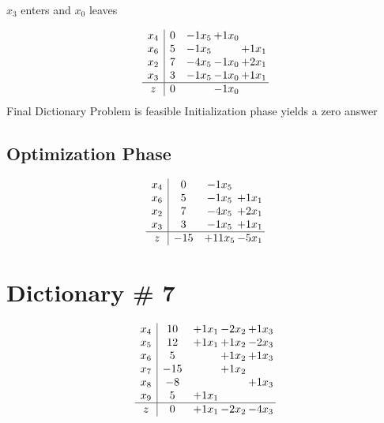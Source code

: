 \documentclass[12pt]{article}
\begin{document}
 $ x_{3} $ enters and $ x_{0} $ leaves 

 \[\begin{array}{c| c c@{\hskip 2pt} c@{\hskip 2pt} c@{\hskip 2pt} }
 x_{4}   &  0 & -1 x_{5} & + 1 x_{0} &   \\
 x_{6}   &  5 & -1 x_{5} &   & + 1 x_{1}\\
 x_{2}   &  7 & -4 x_{5} & -1 x_{0} & + 2 x_{1}\\
 x_{3}   &  3 & -1 x_{5} & -1 x_{0} & + 1 x_{1}\\
\hline
z    &  0  &   & -1 x_{0} &   \\
\end{array}\]
Final Dictionary
Problem is feasible Initialization phase yields a zero answer 

\subsection{Optimization Phase}
\[\begin{array}{c| c c@{\hskip 2pt} c@{\hskip 2pt} }
 x_{4}   &  0 & -1 x_{5} &   \\
 x_{6}   &  5 & -1 x_{5} & + 1 x_{1}\\
 x_{2}   &  7 & -4 x_{5} & + 2 x_{1}\\
 x_{3}   &  3 & -1 x_{5} & + 1 x_{1}\\
\hline
z    &  -15 & + 11 x_{5} & -5 x_{1}\\
\end{array}\]

\section{Dictionary \# 7}

\[\begin{array}{c| c c@{\hskip 2pt} c@{\hskip 2pt} c@{\hskip 2pt} }
 x_{4}   &  10 & + 1 x_{1} & -2 x_{2} & + 1 x_{3}\\
 x_{5}   &  12 & + 1 x_{1} & + 1 x_{2} & -2 x_{3}\\
 x_{6}   &  5  &   & + 1 x_{2} & + 1 x_{3}\\
 x_{7}   &  -15  &   & + 1 x_{2} &   \\
 x_{8}   &  -8  &    &   & + 1 x_{3}\\
 x_{9}   &  5 & + 1 x_{1} &    &   \\
\hline
z    &  0 & + 1 x_{1} & -2 x_{2} & -4 x_{3}\\
\end{array}\]
\end{document}
